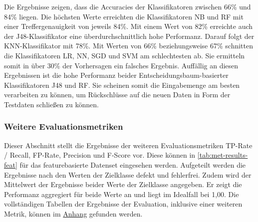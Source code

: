Die Ergebnisse zeigen, dass die Accuracies der Klassifikatoren zwischen 66\% und 84\% liegen. Die höchsten Werte erreichten die Klassifikatoren NB und RF mit einer Treffergenauigkeit von jeweils 84\%. Mit einem Wert von 82\% erreichte auch der J48-Klassifikator eine überdurchschnittlich hohe Performanz. Darauf folgt der KNN-Klassifikator mit 78\%. Mit Werten von 66\% beziehungsweise 67\% schnitten die Klassifikatoren LR, NN, SGD und SVM am schlechtesten ab. Sie ermitteln somit in über 30\% der Vorhersagen ein falsches Ergebnis. Auffällig an diesen Ergebnissen ist die hohe Performanz beider Entscheidungsbaum-basierter Klassifikatoren J48 und RF. Sie scheinen somit die Eingabemenge am besten verarbeiten zu können, um Rückschlüsse auf die neuen Daten in Form der Testdaten schließen zu können.

\subsubsection*{Weitere Evaluationsmetriken}

Dieser Abschnitt stellt die Ergebnisse der weiteren Evaluationsmetriken TP-Rate / Recall, FP-Rate, Precision und F-Score vor. Diese können in \autoref{tab:met-results-feat} für das featurebasierte Datenset eingesehen werden. Aufgeteilt werden die Ergebnisse nach den Werten der Zielklasse \glqq defekt\grqq{} und \glqq fehlerfrei\grqq. Zudem wird der Mittelwert der Ergebnisse beider Werte der Zielklasse angegeben. Er zeigt die Performanz aggregiert für beide Werte an und liegt im Idealfall bei 1,00. Die vollständigen Tabellen der Ergebnisse der Evaluation, inklusive einer weiteren Metrik, können im \hyperref[appendix3]{Anhang} gefunden werden.

